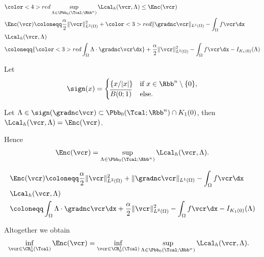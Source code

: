 \begin{frame}
  \begin{align*}
    &{\color<4>{red}\sup_{\Lambda\in\Pbb_0(\Tcal;\Rbb^n)}\Lcal_h(\vcr,\Lambda)
    \leq \Enc(\vcr)}\\
    &\Enc(\vcr)\coloneqq \frac{\alpha}{2}\Vert \vcr\Vert_{L^2(\Omega)}^2
    +{\color<3>{red}\Vert \gradnc\vcr\Vert_{L^1(\Omega)}}
    -\int_\Omega f\vcr\dx\\
    &\Lcal_h(\vcr,\Lambda) \\
    &\coloneqq {\color<3>{red}\int_\Omega\Lambda\cdot\gradnc\vcr\dx} +
    \frac{\alpha}{2}\Vert \vcr\Vert^2_{L^2(\Omega)} -\int_\Omega f\vcr\dx
    - I_{K_1(0)}(\Lambda)
  \end{align*}

  \pause

Let 
\begin{align*}
  \sign(x) = 
    \begin{cases}
      \{x/|x|\} & \text{if } x\in\Rbb^n\setminus\{0\},\\
      \overline{B(0;1)} & \text{else}.
    \end{cases}
\end{align*}

\pause

Let $\Lambda\in\sign(\gradnc\vcr)\subset \Pbb_0(\Tcal;\Rbb^n)\cap
K_1(0)$, then
{$\Lcal_h(\vcr,\Lambda)=\Enc(\vcr)$}.

\pause

  Hence
  \begin{align*}
    \Enc(\vcr)=\sup_{\Lambda\in\Pbb_0(\Tcal;\Rbb^n)}\Lcal_h(\vcr,\Lambda).
  \end{align*}
\end{frame}

\begin{frame}
  \begin{align*}
    &\Enc(\vcr)\coloneqq \frac{\alpha}{2}\Vert \vcr\Vert_{L^2(\Omega)}^2
    +\Vert \gradnc\vcr\Vert_{L^1(\Omega)}
    -\int_\Omega f\vcr\dx\\
    &\Lcal_h(\vcr,\Lambda) \\
    &\coloneqq \int_\Omega\Lambda\cdot\gradnc\vcr\dx +
    \frac{\alpha}{2}\Vert \vcr\Vert^2_{L^2(\Omega)} -\int_\Omega f\vcr\dx
    - I_{K_1(0)}(\Lambda)
  \end{align*}

  \bigskip

  Altogether we obtain
  \begin{align*}
    \inf_{\vcr\in\CR^1_0(\Tcal)}\Enc(\vcr)
    &=\inf_{\vcr\in\CR^1_0(\Tcal)}
    \sup_{\Lambda\in\Pbb_0(\Tcal;\Rbb^n)}\Lcal_h(\vcr,\Lambda).
  \end{align*}
\end{frame}

